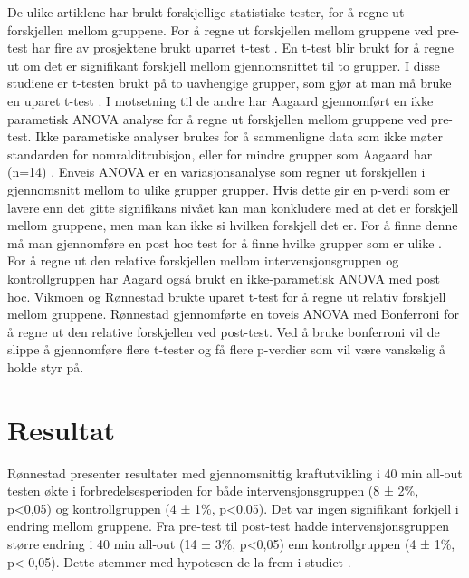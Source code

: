 \documentclass[
]{book}
\begin{document}
De ulike artiklene har brukt forskjellige statistiske tester, for å regne ut forskjellen mellom gruppene. For å regne ut forskjellen mellom gruppene ved pre-test har fire av prosjektene brukt uparret t-test \citep{rønnestad2010a, rønnestad2010b, rønnestad2015, vikmoen2016}. En t-test blir brukt for å regne ut om det er signifikant forskjell mellom gjennomsnittet til to grupper. I disse studiene er t-testen brukt på to uavhengige grupper, som gjør at man må bruke en uparet t-test \citep{kim2015}. I motsetning til de andre har Aagaard \citep{aagaard2011} gjennomført en ikke parametisk ANOVA analyse for å regne ut forskjellen mellom gruppene ved pre-test. Ikke parametiske analyser brukes for å sammenligne data som ikke møter standarden for nomralditrubisjon, eller for mindre grupper som Aagaard har (n=14) \citep{altman2009}. Enveis ANOVA er en variasjonsanalyse som regner ut forskjellen i gjennomsnitt mellom to ulike grupper grupper. Hvis dette gir en p-verdi som er lavere enn det gitte signifikans nivået kan man konkludere med at det er forskjell mellom gruppene, men man kan ikke si hvilken forskjell det er. For å finne denne må man gjennomføre en post hoc test for å finne hvilke grupper som er ulike \citep{kim2017} . For å regne ut den relative forskjellen mellom intervensjonsgruppen og kontrollgruppen har Aagard også brukt en ikke-parametisk ANOVA med post hoc. Vikmoen \citep{vikmoen2016} og Rønnestad \citep{rønnestad2015} brukte uparet t-test for å regne ut relativ forskjell mellom gruppene. Rønnestad \citep{rønnestad2010a, rønnestad2010b} gjennomførte en toveis ANOVA med Bonferroni for å regne ut den relative forskjellen ved post-test. Ved å bruke bonferroni vil de slippe å gjennomføre flere t-tester og få flere p-verdier som vil være vanskelig å holde styr på.

\hypertarget{resultat}{%
\section{Resultat}\label{resultat}}

Rønnestad presenter resultater med gjennomsnittig kraftutvikling i 40 min all-out testen økte i forbredelsesperioden for både intervensjonsgruppen (8 ± 2\%, p\textless0,05) og kontrollgruppen (4 ± 1\%, p\textless0.05). Det var ingen signifikant forkjell i endring mellom gruppene. Fra pre-test til post-test hadde intervensjonsgruppen større endring i 40 min all-out (14 ± 3\%, p\textless0,05) enn kontrollgruppen (4 ± 1\%, p\textless{} 0,05). Dette stemmer med hypotesen de la frem i studiet \citep{rønnestad2010a}.
\end{document}
